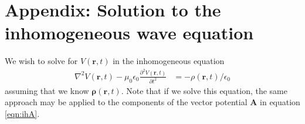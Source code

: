 \documentclass[12pt]{article}
\renewcommand{\vec}[1]{\boldsymbol{#1}}
\begin{document}

\newpage

\appendix

\section{Appendix: Solution to the inhomogeneous wave equation}
\label{appendix:inhomogeneous}

We wish to solve for $V(\vec{r}, t)$ in the inhomogeneous equation
\begin{align}\label{eqn:ihV2}
\nabla^2 V(\vec{r}, t) - \mu_0\epsilon_0 \frac{\partial^2 V(\vec{r}, t)}{\partial t^2} &= -\rho(\vec{r}, t) / \epsilon_0
\end{align}
assuming that we know $\vec{\rho}(\vec{r}, t)$.  Note that if we solve this equation, the same approach may be applied to the components
of the vector potential $\vec{A}$ in equation \ref{eqn:ihA}.
\end{document}

